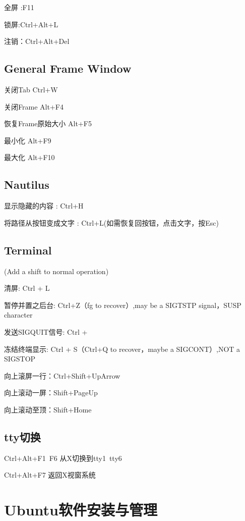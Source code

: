 全屏 :F11

锁屏:Ctrl+Alt+L

注销：Ctrl+Alt+Del

\subsection{General Frame Window}

关闭Tab Ctrl+W

关闭Frame Alt+F4

恢复Frame原始大小  Alt+F5

最小化 Alt+F9

最大化 Alt+F10

\subsection{Nautilus}

显示隐藏的内容 : Ctrl+H

将路径从按钮变成文字 :  Ctrl+L(如需恢复回按钮，点击文字，按Esc)


\subsection{Terminal}

(Add a shift to normal operation)

清屏: Ctrl + L

暂停并置之后台: Ctrl+Z（fg to recover）,may be a SIGTSTP signal，SUSP character

发送SIGQUIT信号: Ctrl + \

冻结终端显示: Ctrl + S（Ctrl+Q to recover，maybe a SIGCONT）,NOT a SIGSTOP

向上滚屏一行：Ctrl+Shift+UpArrow

向上滚动一屏：Shift+PageUp

向上滚动至顶：Shift+Home


\subsection{tty切换}
Ctrl+Alt+F1~F6 从X切换到tty1~tty6

Ctrl+Alt+F7 返回X视窗系统











\section{Ubuntu软件安装与管理}

